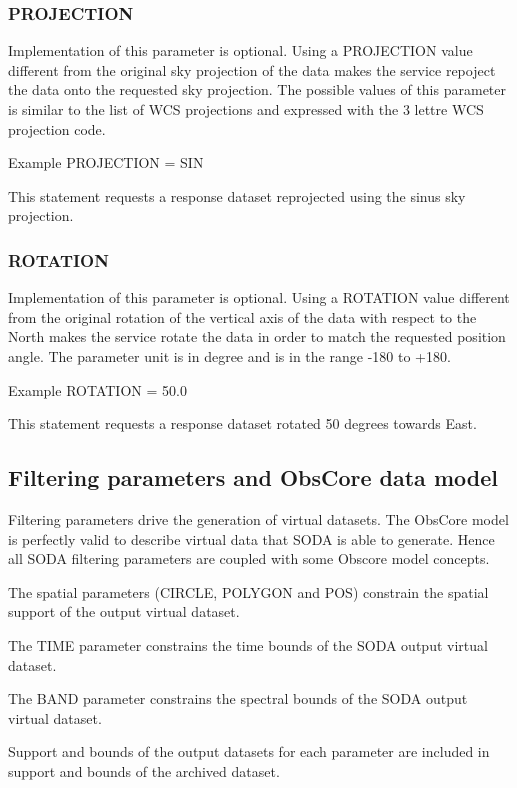 \documentclass[11pt,a4paper]{ivoa}
\begin{document}
\subsubsection{PROJECTION}

Implementation of this parameter is optional. Using a PROJECTION value different from the original sky projection of the data makes the service repoject the data onto the requested sky projection. The possible values of this parameter is similar to the list of WCS projections and expressed with the 3 lettre WCS projection code.

Example PROJECTION = SIN

This statement requests a response dataset reprojected using the sinus sky projection.

\subsubsection{ROTATION}

Implementation of this parameter is optional. Using a ROTATION value different from the original rotation of the vertical axis of the data with respect to the North makes the service rotate the data in order to match  the requested position angle. The  parameter unit is in degree and is in the range -180 to +180.

Example ROTATION = 50.0

This statement requests a response dataset rotated 50 degrees towards East.



\subsection{Filtering parameters and ObsCore data model}


Filtering parameters drive the generation of virtual datasets.  The ObsCore model is perfectly valid to  describe virtual data that SODA is able to generate. Hence all SODA filtering parameters are coupled with some Obscore model concepts.

The spatial parameters (CIRCLE, POLYGON and POS) constrain the spatial support of the output virtual dataset. 


The TIME parameter constrains the time bounds of the SODA output virtual dataset. 

The BAND parameter constrains the spectral bounds of the SODA output virtual 
dataset. 

Support and bounds of the output datasets for each parameter are included in support and bounds of the archived dataset.
\end{document}
